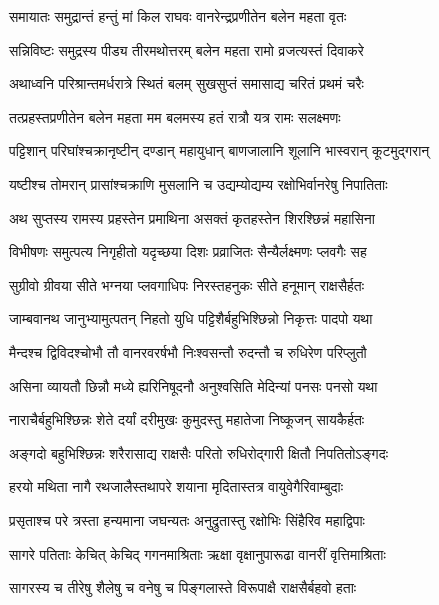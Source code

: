 \twolineshloka
{समायातः समुद्रान्तं हन्तुं मां किल राघवः}
{वानरेन्द्रप्रणीतेन बलेन महता वृतः} %

\twolineshloka
{सन्निविष्टः समुद्रस्य पीड्य तीरमथोत्तरम्}
{बलेन महता रामो व्रजत्यस्तं दिवाकरे} %

\twolineshloka
{अथाध्वनि परिश्रान्तमर्धरात्रे स्थितं बलम्}
{सुखसुप्तं समासाद्य चरितं प्रथमं चरैः} %

\twolineshloka
{तत्प्रहस्तप्रणीतेन बलेन महता मम}
{बलमस्य हतं रात्रौ यत्र रामः सलक्ष्मणः} %

\twolineshloka
{पट्टिशान् परिघांश्चक्रानृष्टीन् दण्डान् महायुधान्}
{बाणजालानि शूलानि भास्वरान् कूटमुद्गरान्} %

\twolineshloka
{यष्टीश्च तोमरान् प्रासांश्चक्राणि मुसलानि च}
{उद्यम्योद्यम्य रक्षोभिर्वानरेषु निपातिताः} %

\twolineshloka
{अथ सुप्तस्य रामस्य प्रहस्तेन प्रमाथिना}
{असक्तं कृतहस्तेन शिरश्छिन्नं महासिना} %

\twolineshloka
{विभीषणः समुत्पत्य निगृहीतो यदृच्छया}
{दिशः प्रव्राजितः सैन्यैर्लक्ष्मणः प्लवगैः सह} %

\twolineshloka
{सुग्रीवो ग्रीवया सीते भग्नया प्लवगाधिपः}
{निरस्तहनुकः सीते हनूमान् राक्षसैर्हतः} %

\twolineshloka
{जाम्बवानथ जानुभ्यामुत्पतन् निहतो युधि}
{पट्टिशैर्बहुभिश्छिन्नो निकृत्तः पादपो यथा} %

\twolineshloka
{मैन्दश्च द्विविदश्चोभौ तौ वानरवरर्षभौ}
{निःश्वसन्तौ रुदन्तौ च रुधिरेण परिप्लुतौ} %

\twolineshloka
{असिना व्यायतौ छिन्नौ मध्ये ह्यरिनिषूदनौ}
{अनुश्वसिति मेदिन्यां पनसः पनसो यथा} %

\twolineshloka
{नाराचैर्बहुभिश्छिन्नः शेते दर्यां दरीमुखः}
{कुमुदस्तु महातेजा निष्कूजन् सायकैर्हतः} %

\twolineshloka
{अङ्गदो बहुभिश्छिन्नः शरैरासाद्य राक्षसैः}
{परितो रुधिरोद्गारी क्षितौ निपतितोऽङ्गदः} %

\twolineshloka
{हरयो मथिता नागै रथजालैस्तथापरे}
{शयाना मृदितास्तत्र वायुवेगैरिवाम्बुदाः} %

\twolineshloka
{प्रसृताश्च परे त्रस्ता हन्यमाना जघन्यतः}
{अनुद्रुतास्तु रक्षोभिः सिंहैरिव महाद्विपाः} %

\twolineshloka
{सागरे पतिताः केचित् केचिद् गगनमाश्रिताः}
{ऋक्षा वृक्षानुपारूढा वानरीं वृत्तिमाश्रिताः} %

\twolineshloka
{सागरस्य च तीरेषु शैलेषु च वनेषु च}
{पिङ्गलास्ते विरूपाक्षै राक्षसैर्बहवो हताः} %

